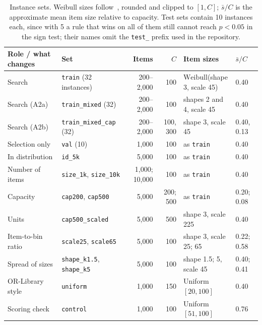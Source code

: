 \documentclass[10pt,twocolumn]{article}
\newcommand{\Weib}{\mathrm{Weibull}}
\begin{document}
\begin{table}[t]
\centering\footnotesize
\caption{Instance sets. Weibull sizes follow~\citep{romera2024funsearch}, rounded and clipped to $[1,C]$; $\bar s/C$ is the approximate mean item size relative to capacity. Test sets contain 10 instances each, since with 5 a rule that wins on all of them still cannot reach $p<0.05$ in the sign test; their names omit the \texttt{test\_} prefix used in the repository.}
\label{tab:sets}
\setlength{\tabcolsep}{3pt}
\begin{tabular}{@{}llrrll@{}}
\toprule
Role / what changes & Set & Items & $C$ & Item sizes & $\bar s/C$\\
\midrule
Search & \texttt{train} (32 instances) & 200--2,000 & 100 & $\Weib$(shape 3, scale 45) & 0.40\\
Search (A2a) & \texttt{train\_mixed} (32) & 200--2,000 & 100 & shapes 2 and 4, scale 45 & 0.40\\
Search (A2b) & \texttt{train\_mixed\_cap} (32) & 200--2,000 & 100, 300 & shape 3, scale 45 & 0.40, 0.13\\
Selection only & \texttt{val} (10) & 1,000 & 100 & as \texttt{train} & 0.40\\
\midrule
In distribution & \texttt{id\_5k} & 5,000 & 100 & as \texttt{train} & 0.40\\
Number of items & \texttt{size\_1k}, \texttt{size\_10k} & 1,000; 10,000 & 100 & as \texttt{train} & 0.40\\
Capacity & \texttt{cap200}, \texttt{cap500} & 5,000 & 200; 500 & as \texttt{train} & 0.20; 0.08\\
Units & \texttt{cap500\_scaled} & 5,000 & 500 & shape 3, scale 225 & 0.40\\
Item-to-bin ratio & \texttt{scale25}, \texttt{scale65} & 5,000 & 100 & shape 3, scale 25; 65 & 0.22; 0.58\\
Spread of sizes & \texttt{shape\_k1.5}, \texttt{shape\_k5} & 5,000 & 100 & shape 1.5; 5, scale 45 & 0.40; 0.41\\
OR-Library style & \texttt{uniform} & 1,000 & 150 & Uniform$[20,100]$ & 0.40\\
Scoring check & \texttt{control} & 1,000 & 100 & Uniform$[51,100]$ & 0.76\\
\bottomrule
\end{tabular}
\end{table}
\end{document}
